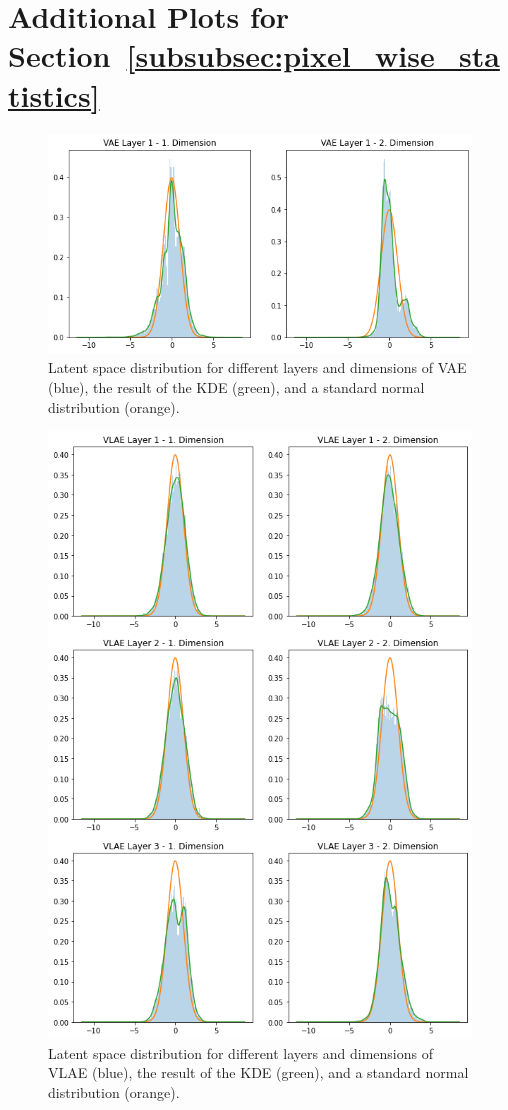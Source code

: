 \documentclass[11pt]{article}
\let\oldsection\section
\renewcommand\section{\clearpage\oldsection}
\begin{document}
\pagebreak
\section{Additional Plots for Section~\ref{subsubsec:pixel_wise_statistics}}\label{sec:appendix_pixel_wise_statistics}

\begin{figure}[H]
\centering
\includegraphics[width=.8\textwidth]{images/generated_vs_true/vae_kde.png}
\caption[\ac{VAE} Estimated Latent Space Distribution]{Latent space distribution for different layers and dimensions of \ac{VAE} (blue), the result of the \ac{KDE} (green), and a standard normal distribution (orange).}
\end{figure}

\begin{figure}[H]
\centering
\includegraphics[width=.8\textwidth]{images/generated_vs_true/vlae_kde.png}
\caption[\ac{VLAE} Estimated Latent Space Distribution]{Latent space distribution for different layers and dimensions of \ac{VLAE} (blue), the result of the \ac{KDE} (green), and a standard normal distribution (orange).}
\end{figure}
\end{document}
